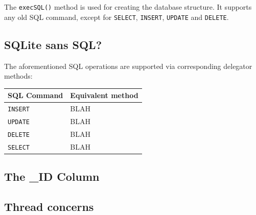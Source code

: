\documentclass{article}
\def\cw#1{\texttt{#1}}
\begin{document}
The \cw{execSQL()} method is used for creating the database structure. It supports any old SQL command, except for \cw{SELECT}, \cw{INSERT}, \cw{UPDATE} and \cw{DELETE}.

\subsection{SQLite sans SQL?}
The aforementioned SQL operations are supported via corresponding delegator methods:

\begin{center}
    \begin{tabular}{ | l | l |}
    \hline
    SQL Command & Equivalent method \\ \hline
    \cw{INSERT} & BLAH \\ \hline
    \cw{UPDATE} & BLAH \\ \hline
    \cw{DELETE} & BLAH \\ \hline
    \cw{SELECT} & BLAH \\ \hline
    \end{tabular}
\end{center}

\subsection{The _ID Column}


\subsection{Thread concerns}
\end{document}
